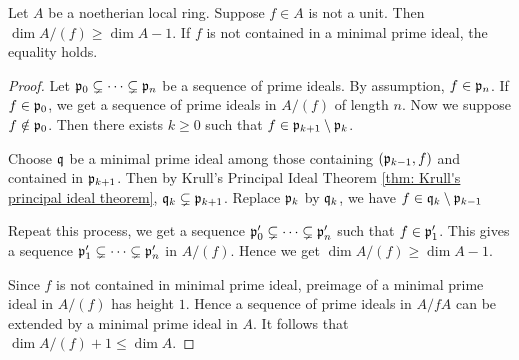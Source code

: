    \begin{corollary}\label{cor: geometric form of principal ideal theorem}
        Let $A$ be a noetherian local ring.
        Suppose $f \in A$ is not a unit.
        Then $\dim A/(f) \geq \dim A - 1$.
        If $f$ is not contained in a minimal prime ideal, the equality holds.
    \end{corollary}
    \begin{proof}
        Let ${\mathfrak{p}}_0 \subsetneq \cdots \subsetneq {\mathfrak{p}}_n$ be a sequence of prime ideals.
        By assumption, $f \in {\mathfrak{p}}_n$.
        If $f \in {\mathfrak{p}}_0$, we get a sequence of prime ideals in $A/(f)$ of length $n$.
        Now we suppose $f \notin {\mathfrak{p}}_0$.
        Then there exists $k \geq 0$ such that $f \in {\mathfrak{p}}_{k+1} \setminus {\mathfrak{p}}_{k}$. 
            
        Choose ${\mathfrak{q}}$ be a minimal prime ideal among those containing $({\mathfrak{p}}_{k-1},f)$ and contained in ${\mathfrak{p}}_{k+1}$.
        Then by Krull's Principal Ideal Theorem \ref{thm: Krull's principal ideal theorem}, ${\mathfrak{q}}_k \subsetneq {\mathfrak{p}}_{k+1}$.
        Replace ${\mathfrak{p}}_k$ by ${\mathfrak{q}}_k$, we have $f \in {\mathfrak{q}}_{k} \setminus {\mathfrak{p}}_{k-1}$

        Repeat this process, we get a sequence ${\mathfrak{p}}_0' \subsetneq \cdots \subsetneq {\mathfrak{p}}_n'$ such that $f \in {\mathfrak{p}}_1'$.
        This gives a sequence ${\mathfrak{p}}_1' \subsetneq \cdots \subsetneq {\mathfrak{p}}_n'$ in $A/(f)$.
        Hence we get $\dim A/(f) \geq \dim A - 1$.
 
        Since $f$ is not contained in minimal prime ideal, preimage of a minimal prime ideal in $A/(f)$ has height $1$.
        Hence a sequence of prime ideals in $A/fA$ can be extended by a minimal prime ideal in $A$.
        It follows that $\dim A/(f) + 1 \leq \dim A$.
    \end{proof}



